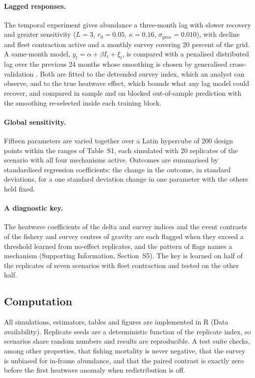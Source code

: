 \documentclass[11pt,a4paper]{article}
\newcommand{\vt}[1]{\text{#1}}
\begin{document}
\paragraph{Lagged responses.} The temporal experiment gives abundance a three-month lag with slower recovery and greater sensitivity ($L=3$, $r_0=0.05$, $\kappa=0.16$, $\sigma_{\vt{proc}}=0.010$), with decline and fleet contraction active and a monthly survey covering 20 percent of the grid. A same-month model, $y_t = \alpha + \beta I_t + \xi_t$, is compared with a penalised distributed lag over the previous 24 months whose smoothing is chosen by generalised cross-validation \citep[Supporting Information, Section~S4;][]{craven1979}. Both are fitted to the detrended survey index, which an analyst can observe, and to the true heatwave effect, which bounds what any lag model could recover, and compared in sample and on blocked out-of-sample prediction with the smoothing re-selected inside each training block.

\paragraph{Global sensitivity.} Fifteen parameters are varied together over a Latin hypercube of 200 design points within the ranges of Table~S1, each simulated with 20 replicates of the scenario with all four mechanisms active. Outcomes are summarised by standardised regression coefficients: the change in the outcome, in standard deviations, for a one standard deviation change in one parameter with the others held fixed.

\paragraph{A diagnostic key.} The heatwave coefficients of the delta and survey indices and the event contrasts of the fishery and survey centres of gravity are each flagged when they exceed a threshold learned from no-effect replicates, and the pattern of flags names a mechanism (Supporting Information, Section~S5). The key is learned on half of the replicates of seven scenarios with fleet contraction and tested on the other half.

\subsection{Computation}

All simulations, estimators, tables and figures are implemented in R (Data availability). Replicate seeds are a deterministic function of the replicate index, so scenarios share random numbers and results are reproducible. A test suite checks, among other properties, that fishing mortality is never negative, that the survey is unbiased for in-frame abundance, and that the paired contrast is exactly zero before the first heatwave anomaly when redistribution is off.
\end{document}
